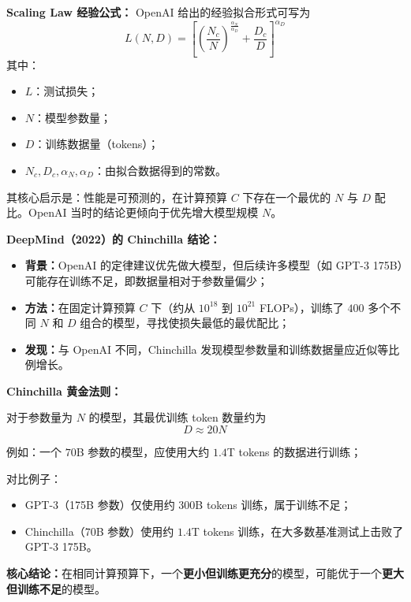 \documentclass[../main.tex]{subfiles}
\begin{document}
\begin{enumerate}
    \item \textbf{Scaling Law 经验公式：}
    OpenAI 给出的经验拟合形式可写为
    $$
    L(N,D)=\left[\left(\frac{N_c}{N}\right)^{\frac{\alpha_N}{\alpha_D}}+\frac{D_c}{D}\right]^{\alpha_D}
    $$
    其中：
    \begin{itemize}
        \item $L$：测试损失；
        \item $N$：模型参数量；
        \item $D$：训练数据量（tokens）；
        \item $N_c,D_c,\alpha_N,\alpha_D$：由拟合数据得到的常数。
    \end{itemize}
    其核心启示是：性能是可预测的，在计算预算 $C$ 下存在一个最优的 $N$ 与 $D$ 配比。OpenAI 当时的结论更倾向于优先增大模型规模 $N$。

    \item \textbf{DeepMind（2022）的 Chinchilla 结论：}
    \begin{itemize}
        \item \textbf{背景：}OpenAI 的定律建议优先做大模型，但后续许多模型（如 GPT-3 175B）可能存在训练不足，即数据量相对于参数量偏少；
        \item \textbf{方法：}在固定计算预算 $C$ 下（约从 $10^{18}$ 到 $10^{21}$ FLOPs），训练了 $400$ 多个不同 $N$ 和 $D$ 组合的模型，寻找使损失最低的最优配比；
        \item \textbf{发现：}与 OpenAI 不同，Chinchilla 发现模型参数量和训练数据量应近似等比例增长。
    \end{itemize}

    \item \textbf{Chinchilla 黄金法则：}
    \begin{itemize}
        \item 对于参数量为 $N$ 的模型，其最优训练 token 数量约为
        $$
        D\approx 20N
        $$
        \item 例如：一个 $70$B 参数的模型，应使用大约 $1.4$T tokens 的数据进行训练；
        {\small\kaishu
        \item 对比例子：
        \begin{itemize}
            \item GPT-3（175B 参数）仅使用约 $300$B tokens 训练，属于训练不足；
            \item Chinchilla（70B 参数）使用约 $1.4$T tokens 训练，在大多数基准测试上击败了 GPT-3 175B。
        \end{itemize}
        }
    \end{itemize}
    \textbf{核心结论：}在相同计算预算下，一个\textbf{更小但训练更充分}的模型，可能优于一个\textbf{更大但训练不足}的模型。
    

\end{enumerate}
\end{document}
